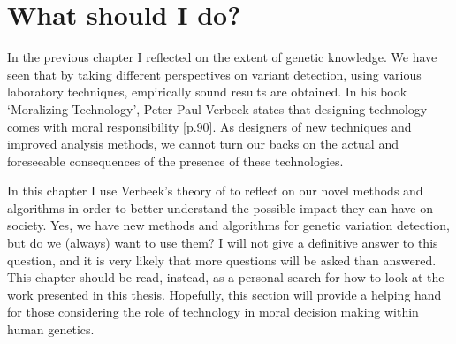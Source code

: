 \chapter[What should I do?]{What should I do? }
\label{chap:ethics}

{ \Large {} }


\newpage

\noindent In the previous chapter I reflected on the extent of genetic knowledge. 
We have seen that by taking different perspectives on variant detection, using various laboratory techniques, empirically sound results are obtained. 
In his book ‘Moralizing Technology’, Peter-Paul Verbeek states that designing technology comes with moral responsibility \cite{Verbeek_2011}[p.90]. 
As designers of new techniques and improved analysis methods, we cannot turn our backs on the actual and foreseeable consequences of the presence of these technologies. 

In this chapter I use Verbeek’s theory of to reflect on our novel methods and algorithms in order to better understand the possible impact they can have on society. 
Yes, we have new methods and algorithms for genetic variation detection, but do we (always) want to use them? I will not give a definitive answer to this question, and it is very likely that more questions will be asked than answered. 
This chapter should be read, instead, as a personal search for how to look at the work presented in this thesis. 
Hopefully, this section will provide a helping hand for those considering the role of technology in moral decision making within human genetics. 




